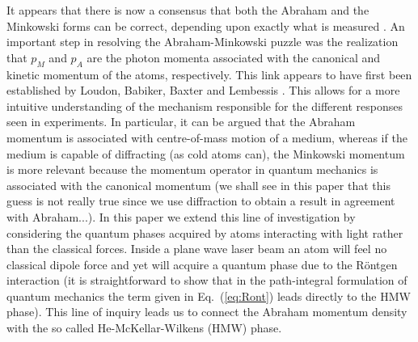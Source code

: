 \documentclass[twocolumn,english,pra,aps,superscriptaddress,floatfix]{revtex4-1}
\begin{document}
It appears that there is now a consensus that both the Abraham and the Minkowski forms can be correct, depending upon exactly what is measured \cite{Loudon05,barnett10}. An important step in resolving the Abraham-Minkowski puzzle was the realization that $p_{M}$ and $p_A$ are the photon momenta associated with the canonical and kinetic momentum of the atoms, respectively.  This link appears to have first been established by Loudon, Babiker, Baxter and Lembessis \cite{lembessis}. This  allows for a more intuitive understanding of the mechanism responsible for the different responses seen in experiments. In particular, it can be argued that the Abraham momentum is associated with centre-of-mass motion of a medium, whereas if the medium is capable of diffracting (as cold atoms can), the Minkowski momentum is more relevant because the momentum operator in quantum mechanics is associated with the canonical momentum (we shall see in this paper that this guess is not really true since we use diffraction to obtain a result in agreement with Abraham...).  In this paper we extend this line of investigation by considering the quantum phases acquired by atoms interacting with light rather than the classical forces. Inside a plane wave laser beam an atom will feel no classical dipole force and yet will acquire a quantum phase due to the R\"{o}ntgen interaction (it is straightforward to show that in the path-integral formulation of quantum mechanics the term given in Eq.\ (\ref{eq:Ront}) leads directly to the HMW phase). This line of inquiry leads us to connect the Abraham momentum density with the so called He-McKellar-Wilkens (HMW) phase. 





 
\end{document}
